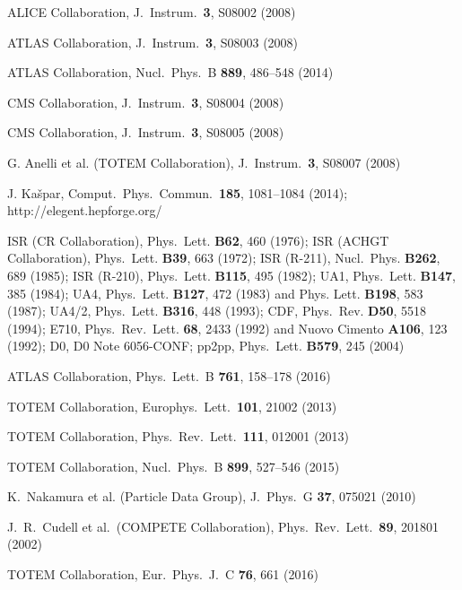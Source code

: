 \documentclass{webofc}
\def\Name#1{#1}
\def\REVIEW#1#2#3#4{#1 \textbf{#2}, #4 (#3)}
\begin{document}
\begin{thebibliography}{99}

	ALICE Collaboration, J.~Instrum.~\textbf{3}, S08002 (2008)

	ATLAS Collaboration, J.~Instrum.~\textbf{3}, S08003 (2008)

	ATLAS Collaboration, Nucl.~Phys.~B \textbf{889}, 486--548 (2014)

	CMS Collaboration, J.~Instrum.~\textbf{3}, S08004 (2008)

	CMS Collaboration, J.~Instrum.~\textbf{3}, S08005 (2008)

	G. Anelli et al. (TOTEM Collaboration), J.~Instrum.~\textbf{3}, S08007 (2008)

	J. Kašpar, Comput.~Phys.~Commun.~\textbf{185}, 1081--1084 (2014); http://elegent.hepforge.org/

	\Name{ISR (CR Collaboration)}, \REVIEW{Phys.~Lett.}{B62}{1976}{460}; 
	\Name{ISR (ACHGT Collaboration)}, \REVIEW{Phys.~Lett.}{B39}{1972}{663}; 
	\Name{ISR (R-211)}, \REVIEW{Nucl.~Phys.}{B262}{1985}{689}; 
	\Name{ISR (R-210)}, \REVIEW{Phys.~Lett.}{B115}{1982}{495}; 
	\Name{UA1}, \REVIEW{Phys.~Lett.}{B147}{1984}{385}; 
	\Name{UA4}, \REVIEW{Phys.~Lett.}{B127}{1983}{472} and \REVIEW{Phys. Lett.}{B198}{1987}{583}; 
	\Name{UA4/2}, \REVIEW{Phys.~Lett.}{B316}{1993}{448}; 
	\Name{CDF}, \REVIEW{Phys.~Rev.}{D50}{1994}{5518}; 
	\Name{E710}, \REVIEW{Phys.~Rev.~Lett.}{68}{1992}{2433} and \REVIEW{Nuovo Cimento}{A106}{1992}{123}; 
	\Name{D0}, D0 Note 6056-CONF; 
	\Name{pp2pp}, \REVIEW{Phys.~Lett.}{B579}{2004}{245}

	ATLAS Collaboration, Phys.~Lett.~B \textbf{761}, 158--178 (2016)

	TOTEM Collaboration, Europhys.~Lett.~\textbf{101}, 21002 (2013)

	TOTEM Collaboration, Phys.~Rev.~Lett.~\textbf{111}, 012001 (2013)

	TOTEM Collaboration, Nucl.~Phys.~B \textbf{899}, 527--546 (2015)

	K.~Nakamura et al. (Particle Data Group), J.~Phys.~G \textbf{37}, 075021 (2010)

	J.~R.~Cudell et al.~(COMPETE Collaboration), Phys.~Rev.~Lett.~\textbf{89}, 201801 (2002)

	TOTEM Collaboration, Eur.~Phys.~J.~C \textbf{76}, 661 (2016)


\end{thebibliography}
\end{document}
